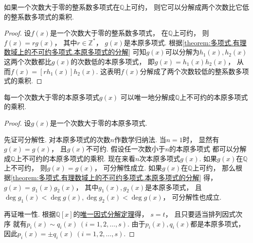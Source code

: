 \begin{corollary}
如果一个次数大于零的整系数多项式在\(\mathbb{Q}\)上可约，
则它可以分解成两个次数比它低的整系数多项式的乘积.
\begin{proof}
设\(f(x)\)是一个次数大于零的整系数多项式，
在\(\mathbb{Q}\)上可约，
则\(f(x)= r g(x)\)，
其中\(r\in\mathbb{Z}^*\)，
\(g(x)\)是本原多项式.
根据\cref{theorem:多项式.有理数域上的不可约多项式.本原多项式的分解}
可知\(g(x)\)可以分解为\(h_1(x),h_2(x)\)
这两个次数都比\(g(x)\)的次数低的本原多项式，
即\(g(x)=h_1(x) h_2(x)\)，
从而\(f(x)=[r h_1(x)] h_2(x)\).
这表明\(f(x)\)分解成了两个次数较低的整系数多项式的乘积.
\end{proof}
\end{corollary}

\begin{theorem}\label{theorem:多项式.有理数域上的不可约多项式.高次本原多项式可唯一分解为不可约本原多项式的乘积}
每一个次数大于零的本原多项式\(g(x)\)
可以唯一地分解成\(\mathbb{Q}\)上不可约的本原多项式的乘积.
\begin{proof}
设\(g(x)\)是一个次数大于零的本原多项式.

先证可分解性.
对本原多项式的次数\(n\)作数学归纳法.
当\(n=1\)时，
显然有\(g(x)=g(x)\)，
且\(g(x)\)不可约.
假设任一次数小于\(n\)的本原多项式
都可以分解成\(\mathbb{Q}\)上不可约的本原多项式的乘积.
现在来看\(n\)次本原多项式\(g(x)\).
如果\(g(x)\)在\(\mathbb{Q}\)上不可约，
则\(g(x)=g(x)\)，
可分解性成立.
如果\(g(x)\)在\(\mathbb{Q}\)上可约，
那么根据\cref{theorem:多项式.有理数域上的不可约多项式.本原多项式的分解} 得，
\(g(x)=g_1(x) g_2(x)\)，
其中\(g_1(x),g_2(x)\)是本原多项式，
且\(\deg g_1(x) < \deg g(x),
\deg g_2(x) < \deg g(x)\)，
可分解性也成立.

再证唯一性.
根据\(\mathbb{Q}[x]\)的\hyperref[theorem:多项式.唯一因式分解定理]{唯一因式分解定理}得，
\(s=t\)，
且只要适当排列因式次序
就有\(p_i(x) \sim q_i(x)\ (i=1,2,\dotsc,s)\).
由于\(p_i(x),q_i(x)\)都是本原多项式，
因此\(p_i(x)=\pm q_i(x)\ (i=1,2,\dotsc,s)\).
\end{proof}
\end{theorem}


